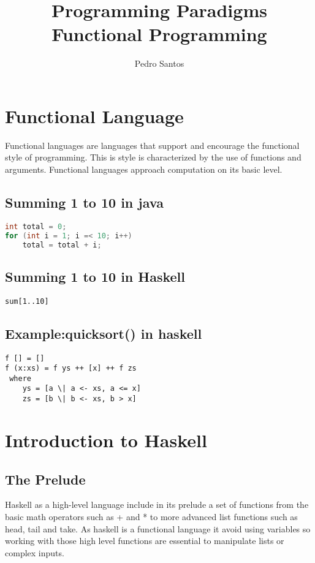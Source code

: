 \documentclass[12pt, oneside]{article}
\title{Programming Paradigms \\ Functional Programming}
\author{Pedro Santos}
\begin{document}
\maketitle
\newpage
\tableofcontents
\section{Functional Language}
Functional languages are languages that support and encourage the functional style of programming. This is style is characterized by the use of functions and arguments. Functional languages approach computation on its basic level. 
\subsection{Summing 1 to 10 in java}
\begin{lstlisting}[language=java]
int total = 0;
for (int i = 1; i =< 10; i++)
	total = total + i; 
\end{lstlisting}
\subsection{Summing 1 to 10 in Haskell}
\begin{lstlisting}
sum[1..10]
\end{lstlisting}
\subsection{Example:quicksort() in haskell}
\begin{lstlisting}
f [] = []
f (x:xs) = f ys ++ [x] ++ f zs
 where
    ys = [a \| a <- xs, a <= x]
    zs = [b \| b <- xs, b > x] 
\end{lstlisting}

\section{Introduction to Haskell}
\subsection{The Prelude}
Haskell as a high-level language include in its prelude a set of functions from the basic math operators such as + and * to more advanced list functions such as head, tail and take. As haskell is a functional language it avoid using variables so working with those high level functions are essential to manipulate lists or complex inputs.
\end{document}
